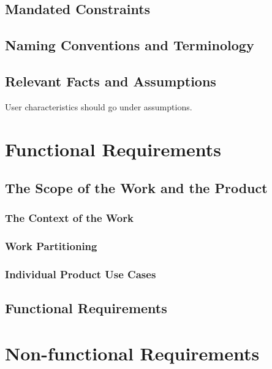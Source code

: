 \documentclass[12pt, titlepage]{article}
\begin{document}
\subsection{Mandated Constraints}

\subsection{Naming Conventions and Terminology}

\subsection{Relevant Facts and Assumptions}

User characteristics should go under assumptions.

\section{Functional Requirements}

\subsection{The Scope of the Work and the Product}

\subsubsection{The Context of the Work}

\subsubsection{Work Partitioning}

\subsubsection{Individual Product Use Cases}

\subsection{Functional Requirements}




\section{Non-functional Requirements}
\end{document}
